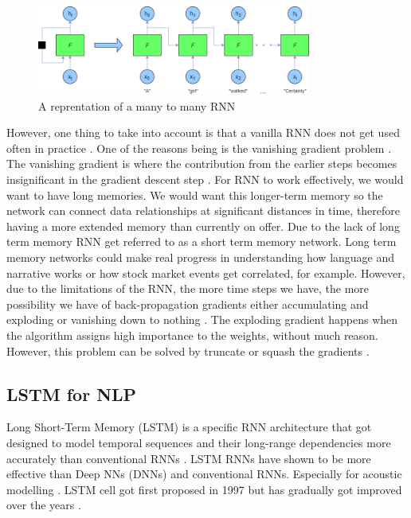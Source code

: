 \documentclass[a4paper,10pt]{article}
\begin{document}
	\begin{figure}
		\begin{center}
			\includegraphics[width=9cm]{Recurrent-neural-network.png}
			\caption{A reprentation of a many to many RNN \cite{adv_in_ml}}
			\label{fig:m2m_rnn_diagram}
		\end{center}
	\end{figure} 
	
	However, one thing to take into account is that a vanilla RNN does not get used often in practice \cite{grus2019data}. One of the reasons being is the vanishing gradient problem \cite{geron2019hands}. The vanishing gradient is where the contribution from the earlier steps becomes insignificant in the gradient descent step \cite{rnn_lstm_explained}. For RNN to work effectively, we would want to have long memories. We would want this longer-term memory so the network can connect data relationships at significant distances in time, therefore having a more extended memory than currently on offer. Due to the lack of long term memory RNN get referred to as a short term memory network. Long term memory networks could make real progress in understanding how language and narrative works or how stock market events get correlated, for example. However, due to the limitations of the RNN, the more time steps we have, the more possibility we have of back-propagation gradients either accumulating and exploding or vanishing down to nothing \cite{adv_in_ml}. The exploding gradient happens when the algorithm assigns high importance to the weights, without much reason. However, this problem can be solved by truncate or squash the gradients \cite{rnn_lstm_explained}.
	

\subsection{LSTM for NLP}
	
	Long Short-Term Memory (LSTM) is a specific RNN architecture that got designed to model temporal sequences and their long-range dependencies more accurately than conventional RNNs \cite{sak2014long, grus2019data}. LSTM RNNs have shown to be more effective than Deep NNs (DNNs) and conventional RNNs. Especially for acoustic modelling \cite{sak2014long}. LSTM cell got first proposed in 1997 \cite{hochreiter1997long} but has gradually got improved over the years \cite{geron2019hands, sak2014long, zaremba2014recurrent}.  
	
\end{document}
